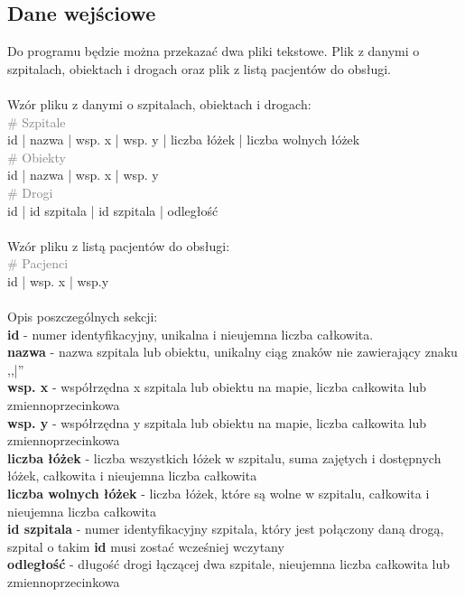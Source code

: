 \documentclass[]{article}
\begin{document}
    \subsection{Dane wejściowe}
    Do programu będzie można przekazać dwa pliki tekstowe. Plik z danymi o szpitalach, obiektach i drogach oraz plik z listą pacjentów do obsługi. \\
    \\
    Wzór pliku z danymi o szpitalach, obiektach i drogach: \\
    \textcolor{gray}{\# Szpitale} \\
    id | nazwa | wsp. x | wsp. y | liczba łóżek | liczba wolnych łóżek \\
    \textcolor{gray}{\# Obiekty} \\
    id | nazwa | wsp. x | wsp. y \\
    \textcolor{gray}{\# Drogi} \\
    id | id szpitala | id szpitala | odległość \\
    \\
    Wzór pliku z listą pacjentów do obsługi: \\
    \textcolor{gray}{\# Pacjenci} \\
    id | wsp. x | wsp.y \\
    \\
    Opis poszczególnych sekcji: \\
    \textbf{id} - numer identyfikacyjny, unikalna i nieujemna liczba całkowita. \\
    \textbf{nazwa} - nazwa szpitala lub obiektu, unikalny ciąg znaków nie zawierający znaku ,,|'' \\
    \textbf{wsp. x} - współrzędna x szpitala lub obiektu na mapie, liczba całkowita lub zmiennoprzecinkowa \\
    \textbf{wsp. y} - współrzędna y szpitala lub obiektu na mapie, liczba całkowita lub zmiennoprzecinkowa \\
    \textbf{liczba łóżek} - liczba wszystkich łóżek w szpitalu, suma zajętych i dostępnych łóżek, całkowita i nieujemna liczba całkowita \\
    \textbf{liczba wolnych łóżek} - liczba łóżek, które są wolne w szpitalu, całkowita i nieujemna liczba całkowita \\
    \textbf{id szpitala} - numer identyfikacyjny szpitala, który jest połączony daną drogą, szpital o takim \textbf{id} musi zostać wcześniej wczytany \\
    \textbf{odległość} - długość drogi łączącej dwa szpitale, nieujemna liczba całkowita lub zmiennoprzecinkowa \\
\end{document}
